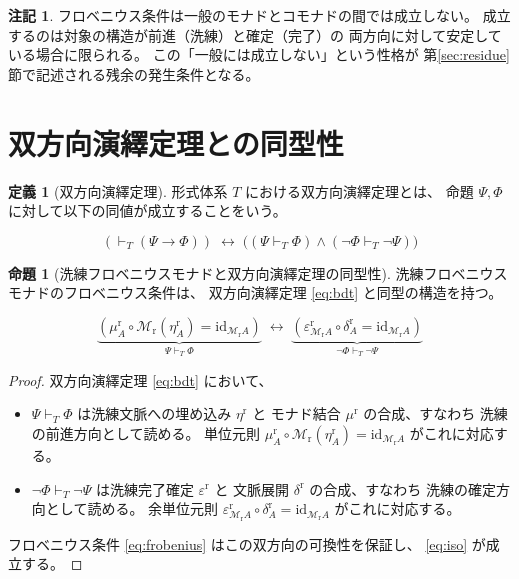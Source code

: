 \documentclass[11pt,a4paper]{article}
\theoremstyle{definition}
\newtheorem{definition}{定義}[section]
\newtheorem{proposition}{命題}[section]
\newtheorem{remark}{注記}[section]
\newcommand{\Mr}{\mathcal{M}_{\mathrm{r}}}
\newcommand{\etar}{\eta^{\mathrm{r}}}
\newcommand{\mur}{\mu^{\mathrm{r}}}
\newcommand{\epsr}{\varepsilon^{\mathrm{r}}}
\newcommand{\deltar}{\delta^{\mathrm{r}}}
\newcommand{\id}{\mathrm{id}}
\begin{document}
\begin{remark}
フロベニウス条件は一般のモナドとコモナドの間では成立しない。
成立するのは対象の構造が前進（洗練）と確定（完了）の
両方向に対して安定している場合に限られる。
この「一般には成立しない」という性格が
第\ref{sec:residue}節で記述される残余の発生条件となる。
\end{remark}

\section{双方向演繹定理との同型性}

\begin{definition}[双方向演繹定理]
形式体系 $T$ における双方向演繹定理とは、
命題 $\Psi, \Phi$ に対して以下の同値が成立することをいう。

\begin{equation}
(\vdash_T (\Psi \to \Phi))
\;\leftrightarrow\;
\bigl((\Psi \vdash_T \Phi) \land (\neg\Phi \vdash_T \neg\Psi)\bigr)
\label{eq:bdt}
\end{equation}
\end{definition}

\begin{proposition}[洗練フロベニウスモナドと双方向演繹定理の同型性]
洗練フロベニウスモナドのフロベニウス条件は、
双方向演繹定理 \eqref{eq:bdt} と同型の構造を持つ。

\begin{equation}
\underbrace{(\mur_A \circ \Mr(\etar_A) = \id_{\Mr A})}_{\Psi \vdash_T \Phi}
\;\leftrightarrow\;
\underbrace{(\epsr_{\Mr A} \circ \deltar_A = \id_{\Mr A})}_{\neg\Phi \vdash_T \neg\Psi}
\label{eq:iso}
\end{equation}
\end{proposition}

\begin{proof}
双方向演繹定理 \eqref{eq:bdt} において、

\begin{itemize}
\item $\Psi \vdash_T \Phi$ は洗練文脈への埋め込み $\etar$ と
  モナド結合 $\mur$ の合成、すなわち
  洗練の前進方向として読める。
  単位元則 $\mur_A \circ \Mr(\etar_A) = \id_{\Mr A}$ がこれに対応する。

\item $\neg\Phi \vdash_T \neg\Psi$ は洗練完了確定 $\epsr$ と
  文脈展開 $\deltar$ の合成、すなわち
  洗練の確定方向として読める。
  余単位元則 $\epsr_{\Mr A} \circ \deltar_A = \id_{\Mr A}$ がこれに対応する。
\end{itemize}

フロベニウス条件 \eqref{eq:frobenius} はこの双方向の可換性を保証し、
\eqref{eq:iso} が成立する。
\end{proof}
\end{document}
